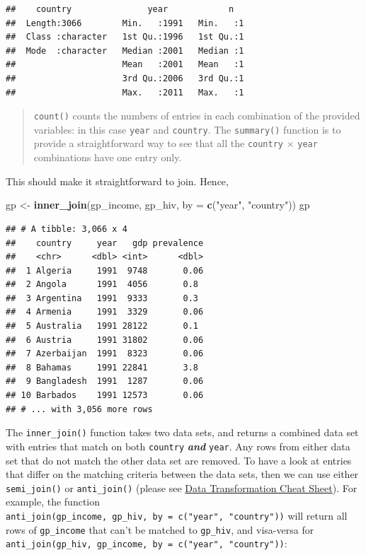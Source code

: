 \documentclass[]{book}
\newenvironment{Shaded}{\begin{snugshade}}{\end{snugshade}}
\newcommand{\KeywordTok}[1]{\textcolor[rgb]{0.13,0.29,0.53}{\textbf{{#1}}}}
\newcommand{\DataTypeTok}[1]{\textcolor[rgb]{0.13,0.29,0.53}{{#1}}}
\newcommand{\StringTok}[1]{\textcolor[rgb]{0.31,0.60,0.02}{{#1}}}
\newcommand{\NormalTok}[1]{{#1}}
\theoremstyle{definition}
\theoremstyle{definition}
\theoremstyle{definition}
\theoremstyle{remark}
\begin{document}
\begin{verbatim}
##    country               year            n    
##  Length:3066        Min.   :1991   Min.   :1  
##  Class :character   1st Qu.:1996   1st Qu.:1  
##  Mode  :character   Median :2001   Median :1  
##                     Mean   :2001   Mean   :1  
##                     3rd Qu.:2006   3rd Qu.:1  
##                     Max.   :2011   Max.   :1
\end{verbatim}

\begin{quote}
\texttt{count()} counts the numbers of entries in each combination of
the provided variables: in this case \texttt{year} and \texttt{country}.
The \texttt{summary()} function is to provide a straightforward way to
see that all the \texttt{country} \(\times\) \texttt{year} combinations
have one entry only.
\end{quote}

This should make it straightforward to join. Hence,

\begin{Shaded}
\begin{Highlighting}[]
\NormalTok{gp <-}\StringTok{ }\KeywordTok{inner_join}\NormalTok{(gp_income, gp_hiv, }\DataTypeTok{by =} \KeywordTok{c}\NormalTok{(}\StringTok{"year"}\NormalTok{, }\StringTok{"country"}\NormalTok{))}
\NormalTok{gp}
\end{Highlighting}
\end{Shaded}

\begin{verbatim}
## # A tibble: 3,066 x 4
##    country     year   gdp prevalence
##    <chr>      <dbl> <int>      <dbl>
##  1 Algeria     1991  9748       0.06
##  2 Angola      1991  4056       0.8 
##  3 Argentina   1991  9333       0.3 
##  4 Armenia     1991  3329       0.06
##  5 Australia   1991 28122       0.1 
##  6 Austria     1991 31802       0.06
##  7 Azerbaijan  1991  8323       0.06
##  8 Bahamas     1991 22841       3.8 
##  9 Bangladesh  1991  1287       0.06
## 10 Barbados    1991 12573       0.06
## # ... with 3,056 more rows
\end{verbatim}

The \texttt{inner\_join()} function takes two data sets, and returns a
combined data set with entries that match on both \texttt{country}
\textbf{\emph{and}} \texttt{year}. Any rows from either data set that do
not match the other data set are removed. To have a look at entries that
differ on the matching criteria between the data sets, then we can use
either \texttt{semi\_join()} or \texttt{anti\_join()} (please see
\href{https://github.com/rstudio/cheatsheets/raw/master/data-transformation.pdf}{Data
Transformation Cheat Sheet}). For example, the function
\texttt{anti\_join(gp\_income,\ gp\_hiv,\ by\ =\ c("year",\ "country"))}
will return all rows of \texttt{gp\_income} that can't be matched to
\texttt{gp\_hiv}, and visa-versa for
\texttt{anti\_join(gp\_hiv,\ gp\_income,\ by\ =\ c("year",\ "country"))}:
\end{document}
